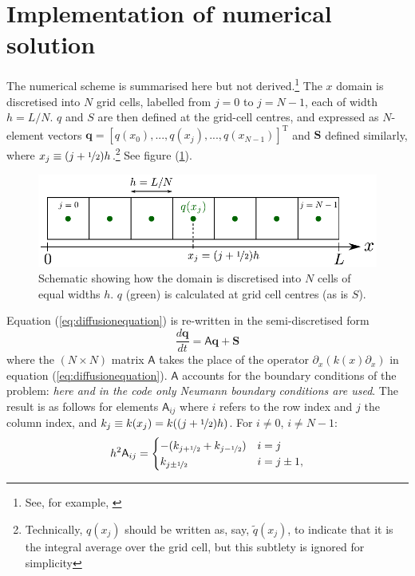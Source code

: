 \documentclass[12pt]{article}
\begin{document}
\section{Implementation of numerical solution}
The numerical scheme is summarised here but not derived.\footnote{See, for example, \color{blue}\underline{\href{http://www.csc.kth.se/utbildning/kth/kurser/DN2255/ndiff13/Lecture3.pdf}{}}\color{black}} The $x$ domain is discretised into $N$ grid cells, labelled from $j=0$ to $j=N-1$, each of width $h = L/N$. $q$ and $S$ are then defined at the grid-cell centres, and expressed as $N$-element vectors $\mathbf{q}=[q(x_0),...,q(x_j),...,q(x_{N-1})]^\mathrm{T}$ and $\mathbf{S}$ defined similarly, where $x_j\equiv(j+\nicefrac{1}{2})h$.\footnote{Technically, $q(x_j)$ should be written as, say, $\tilde{q}(x_j)$, to indicate that it is the integral average over the grid cell, but this subtlety is ignored for simplicity} See figure (\ref{fig:gridschematic}).
\begin{figure}[h]
\centering
\includegraphics[width=0.8\linewidth]{grid_schematic.pdf}
\caption{Schematic showing how the domain is discretised into $N$ cells of equal widths $h$. $q$ (green) is calculated at grid cell centres (as is $S$).}
\label{fig:gridschematic}
\end{figure}

\noindent
Equation (\ref{eq:diffusionequation}) is re-written in the semi-discretised form
\begin{equation}\label{eq:semidiscrete}
\frac{d\mathbf{q}}{dt} = \mathsf{A}\mathbf{q} + \mathbf{S}
\end{equation}
where the $(N\times N)$ matrix $\mathsf{A}$ takes the place of the operator $\partial_x(k(x)\partial_x)$ in equation (\ref{eq:diffusionequation}). $\mathsf{A}$ accounts for the boundary conditions of the problem: \textit{here and in the code only Neumann boundary conditions are used}. The result is as follows for elements $\mathsf{A}_{ij}$ where $i$ refers to the row index and $j$ the column index, and $k_j\equiv k(x_j)=k((j+\nicefrac{1}{2})h)$. For $i\neq 0$, $i\neq N-1$:
\begin{equation}\label{eq:matrixelements}
h^2\mathsf{A}_{ij} = \begin{cases}
    -(k_{j+\nicefrac{1}{2}}+k_{j-\nicefrac{1}{2}}) & i=j \\
    k_{j\pm\nicefrac{1}{2}} & i=j\pm1, \\
    \end{cases}
\end{equation}
\end{document}
